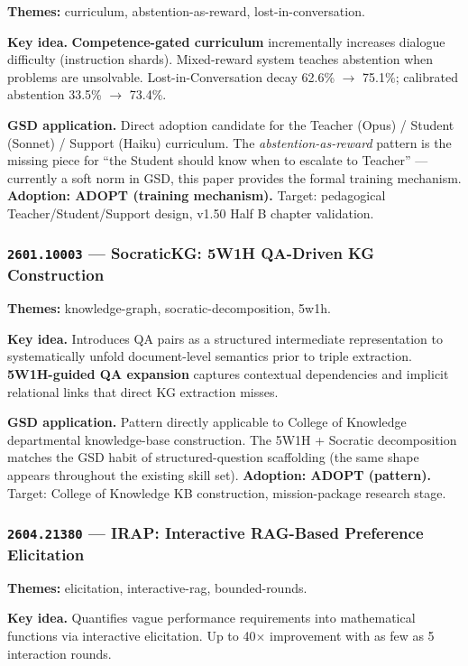 \documentclass[11pt,letterpaper]{article}
\newcommand{\arxivid}[1]{\texttt{\textcolor{accent}{#1}}}
\newcommand{\paperhead}[2]{\noindent\textbf{\sffamily\textcolor{secondary}{#1}} \textemdash{} #2}
\begin{document}
\paperhead{Themes:}{curriculum, abstention-as-reward, lost-in-conversation.}

\textbf{Key idea.} \textbf{Competence-gated curriculum} incrementally increases dialogue difficulty (instruction shards). Mixed-reward system teaches abstention when problems are unsolvable. Lost-in-Conversation decay 62.6\% $\rightarrow$ 75.1\%; calibrated abstention 33.5\% $\rightarrow$ 73.4\%.

\textbf{GSD application.} Direct adoption candidate for the Teacher (Opus) / Student (Sonnet) / Support (Haiku) curriculum. The \textit{abstention-as-reward} pattern is the missing piece for ``the Student should know when to escalate to Teacher'' --- currently a soft norm in GSD, this paper provides the formal training mechanism. \textbf{Adoption: ADOPT (training mechanism).} Target: pedagogical Teacher/Student/Support design, v1.50 Half B chapter validation.

\subsubsection{\arxivid{2601.10003} --- SocraticKG: 5W1H QA-Driven KG Construction}

\paperhead{Themes:}{knowledge-graph, socratic-decomposition, 5w1h.}

\textbf{Key idea.} Introduces QA pairs as a structured intermediate representation to systematically unfold document-level semantics prior to triple extraction. \textbf{5W1H-guided QA expansion} captures contextual dependencies and implicit relational links that direct KG extraction misses.

\textbf{GSD application.} Pattern directly applicable to College of Knowledge departmental knowledge-base construction. The 5W1H + Socratic decomposition matches the GSD habit of structured-question scaffolding (the same shape appears throughout the existing skill set). \textbf{Adoption: ADOPT (pattern).} Target: College of Knowledge KB construction, mission-package research stage.

\subsubsection{\arxivid{2604.21380} --- IRAP: Interactive RAG-Based Preference Elicitation}

\paperhead{Themes:}{elicitation, interactive-rag, bounded-rounds.}

\textbf{Key idea.} Quantifies vague performance requirements into mathematical functions via interactive elicitation. Up to 40$\times$ improvement with as few as 5 interaction rounds.
\end{document}
